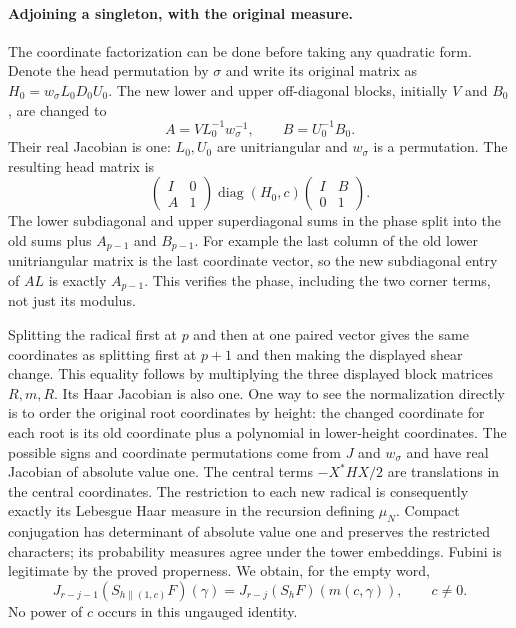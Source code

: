 \paragraph{Adjoining a singleton, with the original measure.}
The coordinate factorization can be done before taking any
quadratic form.  Denote the head permutation by $\sigma$ and write
its original matrix as $H_0=w_\sigma L_0D_0U_0$.
The new lower and upper off-diagonal blocks, initially $V$ and $B_0$,
are changed to
\[
                  A=VL_0^{-1}w_\sigma^{-1},\qquad
                  B=U_0^{-1}B_0.
\]
Their real Jacobian is one: $L_0,U_0$ are unitriangular and
$w_\sigma$ is a permutation.  The resulting head matrix is
\[
 \begin{pmatrix}I&0\\ A&1\end{pmatrix}
       \operatorname{diag}(H_0,c)
       \begin{pmatrix}I&B\\0&1\end{pmatrix}.
\]
The lower subdiagonal and upper superdiagonal sums in the phase
split into the old sums plus $A_{p-1}$ and $B_{p-1}$.
For example the last column of the old lower unitriangular
matrix is the last coordinate vector, so the new subdiagonal
entry of $A L$ is exactly $A_{p-1}$.  This verifies the phase,
including the two corner terms, not just its modulus.

Splitting the radical first at $p$ and then at one paired vector
gives the same coordinates as splitting first at $p+1$ and then
making the displayed shear change.  This equality follows by
multiplying the three displayed block matrices $R,m,R$.
Its Haar Jacobian is also one.  One way to see the normalization
directly is to order the original root coordinates by height:
the changed coordinate for each root is its old coordinate plus
a polynomial in lower-height coordinates.  The possible signs
and coordinate permutations come from $J$ and $w_\sigma$ and
have real Jacobian of absolute value one.  The central terms
$-X^*HX/2$ are translations in the central coordinates.  The
restriction to each new radical is consequently exactly its
Lebesgue Haar measure in the recursion defining $\mu_N$.
Compact conjugation has determinant of absolute value one and
preserves the restricted characters; its probability measures
agree under the tower embeddings.  Fubini is legitimate by the
proved properness.  We obtain, for the empty word,
\begin{equation}\label{partial-head-empty-step}
 J_{r-j-1}(S_{h\mathbin{\|}(1,c)}F)(\gamma)
       =J_{r-j}(S_hF)(m(c,\gamma)),\qquad c\ne0.
\end{equation}
No power of $c$ occurs in this ungauged identity.

